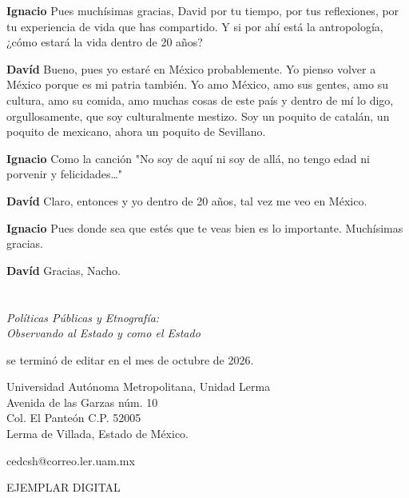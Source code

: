\documentclass[
  spanish,
  11pt,
  a4paper,
]{scrbook}
\newenvironment{transcripcion}{
    \begin{list}{}{
        \setlength{\leftmargin}{1.5em}  %
        \setlength{\rightmargin}{0em}
        \setlength{\itemsep}{0.2em}     %
        \setlength{\parsep}{0.0em}
        \setlength{\listparindent}{0pt}
    }
}{
    \end{list}
}
\newcommand{\personaje}[1]{\textbf{#1}\quad}
\begin{document}
\begin{transcripcion}
\item \personaje{Ignacio} Pues muchísimas gracias, David por tu tiempo, por tus reflexiones, por tu experiencia de vida que has compartido. Y si por ahí está la antropología, ¿cómo estará la vida dentro de 20 años?

\item \personaje{Davíd} Bueno, pues yo estaré en México probablemente. Yo pienso volver a México porque es mi patria también. Yo amo México, amo sus gentes, amo su cultura, amo su comida, amo muchas cosas de este país y dentro de mí lo digo, orgullosamente, que soy culturalmente mestizo. Soy un poquito de catalán, un poquito de mexicano, ahora un poquito de Sevillano.

\item \personaje{Ignacio} Como la canción "No soy de aquí ni soy de allá, no tengo edad ni porvenir y felicidades…"

\item \personaje{Davíd} Claro, entonces y yo dentro de 20 años, tal vez me veo en México.

\item \personaje{Ignacio} Pues donde sea que estés que te veas bien es lo importante. Muchísimas gracias.

\item \personaje{Davíd} Gracias, Nacho.

\end{transcripcion}


\chapter{}\label{section}

\begin{center}
\vspace*{4cm}

\textit{Políticas Públicas y Etnografía: \\ Observando al Estado y como el Estado}

\vspace{0.5cm}

se terminó de editar en el mes de octubre de 2026.

\vspace{0.5cm}

Universidad Autónoma Metropolitana, Unidad Lerma \\
Avenida de las Garzas núm. 10 \\ 
Col. El Panteón C.P. 52005 \\
Lerma de Villada, Estado de México. \\

\vspace{1cm}

cedcsh@correo.ler.uam.mx 

\vspace{1cm}

EJEMPLAR DIGITAL

\end{center}


\backmatter
\printbibliography
\end{document}
